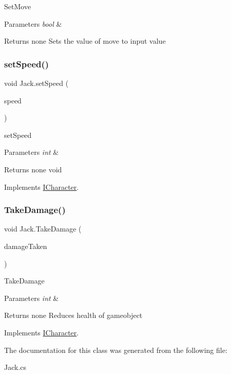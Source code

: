 Set\+Move 
\begin{DoxyParams}{Parameters}
{\em bool} & \\
\hline
\end{DoxyParams}
\begin{DoxyReturn}{Returns}
none Sets the value of move to input value 
\end{DoxyReturn}
\mbox{\label{class_jack_a9ae28ec3e59646a7f5cdd7a2fcf58a20}} 
\subsubsection{\texorpdfstring{set\+Speed()}{setSpeed()}}
{\footnotesize\ttfamily void Jack.\+set\+Speed (\begin{DoxyParamCaption}\item[{int}]{speed }\end{DoxyParamCaption})\hspace{0.3cm}{\ttfamily [inline]}}

set\+Speed 
\begin{DoxyParams}{Parameters}
{\em int} & \\
\hline
\end{DoxyParams}
\begin{DoxyReturn}{Returns}
none void 
\end{DoxyReturn}


Implements \mbox{\hyperlink{interface_i_character}{I\+Character}}.

\mbox{\label{class_jack_af6f345fe0fa0b4d3633b671d31d0d76e}} 
\subsubsection{\texorpdfstring{Take\+Damage()}{TakeDamage()}}
{\footnotesize\ttfamily void Jack.\+Take\+Damage (\begin{DoxyParamCaption}\item[{int}]{damage\+Taken }\end{DoxyParamCaption})\hspace{0.3cm}{\ttfamily [inline]}}

Take\+Damage 
\begin{DoxyParams}{Parameters}
{\em int} & \\
\hline
\end{DoxyParams}
\begin{DoxyReturn}{Returns}
none Reduces health of gameobject 
\end{DoxyReturn}


Implements \mbox{\hyperlink{interface_i_character}{I\+Character}}.



The documentation for this class was generated from the following file\+:\begin{DoxyCompactItemize}
\item 
Jack.\+cs\end{DoxyCompactItemize}
